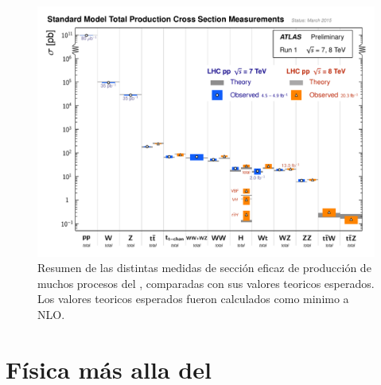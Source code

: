 \begin{figure}[h]
  \centering
  \includegraphics[width=1\textwidth]{figures/ATLAS_a_SMSummary_TotalXsect.pdf}
  \caption{Resumen de las distintas medidas de secci\'on eficaz de producci\'on de muchos
    procesos del {\SM}, comparadas con sus valores teoricos esperados.
    Los valores teoricos esperados fueron calculados como minimo a NLO.
  }\label{fig:sm_atlas_xs}
\end{figure}


\section{Física más alla del {\SM}}

